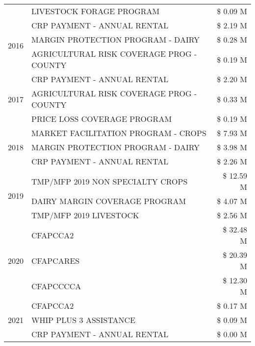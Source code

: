 \begin{tabular}{llr}
 & LIVESTOCK FORAGE PROGRAM & \$ 0.09 M \\
\cline{1-3}
\multirow[t]{3}{*}{2016} & CRP PAYMENT - ANNUAL RENTAL & \$ 2.19 M \\
 & MARGIN PROTECTION PROGRAM - DAIRY & \$ 0.28 M \\
 & AGRICULTURAL RISK COVERAGE PROG - COUNTY & \$ 0.19 M \\
\cline{1-3}
\multirow[t]{3}{*}{2017} & CRP PAYMENT - ANNUAL RENTAL & \$ 2.20 M \\
 & AGRICULTURAL RISK COVERAGE PROG - COUNTY & \$ 0.33 M \\
 & PRICE LOSS COVERAGE PROGRAM & \$ 0.19 M \\
\cline{1-3}
\multirow[t]{3}{*}{2018} & MARKET FACILITATION PROGRAM - CROPS & \$ 7.93 M \\
 & MARGIN PROTECTION PROGRAM - DAIRY & \$ 3.98 M \\
 & CRP PAYMENT - ANNUAL RENTAL & \$ 2.26 M \\
\cline{1-3}
\multirow[t]{3}{*}{2019} & TMP/MFP 2019 NON SPECIALTY CROPS & \$ 12.59 M \\
 & DAIRY MARGIN COVERAGE PROGRAM & \$ 4.07 M \\
 & TMP/MFP 2019 LIVESTOCK & \$ 2.56 M \\
\cline{1-3}
\multirow[t]{3}{*}{2020} & CFAPCCA2 & \$ 32.48 M \\
 & CFAPCARES & \$ 20.39 M \\
 & CFAPCCCCA & \$ 12.30 M \\
\cline{1-3}
\multirow[t]{3}{*}{2021} & CFAPCCA2 & \$ 0.17 M \\
 & WHIP PLUS 3 ASSISTANCE & \$ 0.09 M \\
 & CRP PAYMENT - ANNUAL RENTAL & \$ 0.00 M \\
\cline{1-3}
\bottomrule
\end{tabular}
